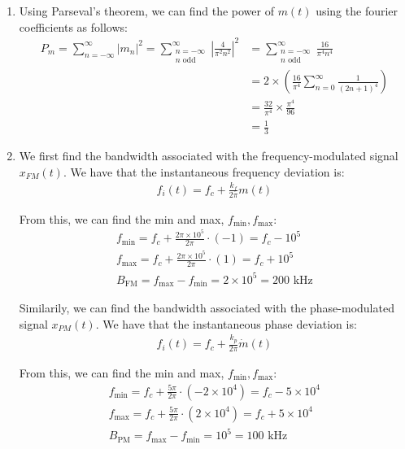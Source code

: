 \documentclass{article}
\begin{document}
\begin{enumerate}[label=3.\arabic*]
    \item Using Parseval's theorem, we can find the power of $m(t)$ using the fourier coefficients as follows:
    \begin{align*}
        P_m = \sum_{n=-\infty}^{\infty} |m_n|^2 = \sum_{\substack{n=-\infty \\ n \text{ odd}}}^{\infty} \left|\frac{4}{\pi^2 n^2}\right|^2 &= \sum_{\substack{n=-\infty \\ n \text{ odd}}}^{\infty} \frac{16}{\pi^4 n^4} \\
        &= 2\times\left(\frac{16}{\pi^4}
            \sum_{n=0}^{\infty} \frac{1}{(2n+1)^4}
        \right) \\
        &= \frac{32}{\pi^4} \times \frac{\pi^4}{96} \\
        &= \frac{1}{3}
    \end{align*}

    \item We first find the bandwidth associated with the frequency-modulated signal $x_{FM}(t)$. We have that the instantaneous frequency deviation is:
    \begin{align*}
        f_i(t) = f_c + \frac{k_f}{2\pi}m(t)
    \end{align*}

    From this, we can find the min and max, $f_{\text{min}}, f_{\text{max}}$:
    \begin{align*}
        f_{\text{min}} = f_c + \frac{2\pi \times 10^5}{2\pi} \cdot (-1) = f_c - 10^5 \\
        f_{\text{max}} = f_c + \frac{2\pi \times 10^5}{2\pi} \cdot (1) = f_c + 10^5 \\
        B_{\text{FM}} = f_{\text{max}} - f_{\text{min}} = 2\times10^5 = 200 \text{ kHz}
    \end{align*}

    Similarily, we can find the bandwidth associated with the phase-modulated signal $x_{PM}(t)$. We have that the instantaneous phase deviation is:
    \begin{align*}
        f_i(t) = f_c + \frac{k_p}{2\pi}\dot{m}(t)
    \end{align*}

    From this, we can find the min and max, $f_{\text{min}}, f_{\text{max}}$:
    \begin{align*}
        f_{\text{min}} = f_c + \frac{5\pi}{2\pi} \cdot (-2\times10^4) = f_c - 5 \times 10^4 \\
        f_{\text{max}} = f_c + \frac{5\pi}{2\pi} \cdot (2\times10^4) = f_c + 5 \times 10^4 \\
        B_{\text{PM}} = f_{\text{max}} - f_{\text{min}} = 10^5 = 100 \text{ kHz}
    \end{align*}


\end{enumerate}
\end{document}
